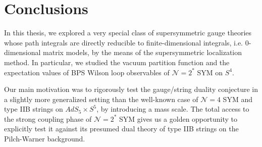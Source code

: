 \chapter{Conclusions}



In this thesis, 
we explored a very special class of supersymmetric gauge theories whose path integrals are directly reducible to finite-dimensional integrals, 
i.e. 0-dimensional matrix models, by the means of the supersymmetric localization method.
In particular, we studied the vacuum partition function and the expectation values of BPS Wilson loop observables of $\mathcal{N}=2^*$ SYM on $S^4$.


Our main motivation was to rigorously test the gauge/string duality conjecture 
in a slightly more generalized setting than the well-known case of $\mathcal{N}=4$  SYM and type IIB strings on $AdS_5 \times S^5$, 
by introducing a mass scale. 
The total access to the strong coupling phase of $\mathcal{N}=2^*$ SYM gives us a golden opportunity to explicitly test it 
against its presumed dual theory of type IIB strings on the Pilch-Warner background.

